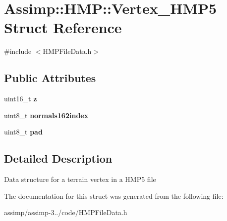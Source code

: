 \hypertarget{struct_assimp_1_1_h_m_p_1_1_vertex___h_m_p5}{\section{Assimp\+:\+:H\+M\+P\+:\+:Vertex\+\_\+\+H\+M\+P5 Struct Reference}
\label{struct_assimp_1_1_h_m_p_1_1_vertex___h_m_p5}
}


{\ttfamily \#include $<$H\+M\+P\+File\+Data.\+h$>$}

\subsection*{Public Attributes}
\begin{DoxyCompactItemize}
\item 
\hypertarget{struct_assimp_1_1_h_m_p_1_1_vertex___h_m_p5_a5fb5a5ecbad0131374f0cd5f44dc13f1}{uint16\+\_\+t {\bfseries z}}\label{struct_assimp_1_1_h_m_p_1_1_vertex___h_m_p5_a5fb5a5ecbad0131374f0cd5f44dc13f1}

\item 
\hypertarget{struct_assimp_1_1_h_m_p_1_1_vertex___h_m_p5_a56b259fb0597bcbfe8377de04f13a008}{uint8\+\_\+t {\bfseries normals162index}}\label{struct_assimp_1_1_h_m_p_1_1_vertex___h_m_p5_a56b259fb0597bcbfe8377de04f13a008}

\item 
\hypertarget{struct_assimp_1_1_h_m_p_1_1_vertex___h_m_p5_ac32f5aee9d19595f824336eb0e137097}{uint8\+\_\+t {\bfseries pad}}\label{struct_assimp_1_1_h_m_p_1_1_vertex___h_m_p5_ac32f5aee9d19595f824336eb0e137097}

\end{DoxyCompactItemize}


\subsection{Detailed Description}
Data structure for a terrain vertex in a H\+M\+P5 file 

The documentation for this struct was generated from the following file\+:\begin{DoxyCompactItemize}
\item 
assimp/assimp-\/3../code/H\+M\+P\+File\+Data.\+h\end{DoxyCompactItemize}
